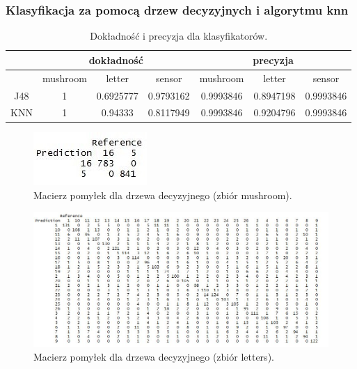 \documentclass[11pt,a4paper,twoside]{article}
\begin{document}
\newpage


\subsubsection{Klasyfikacja za pomocą drzew decyzyjnych i algorytmu knn}

\begin{table}[ht]
\centering
\caption{Dokładność i precyzja dla klasyfikatorów.}
\label{accPrec_v2}
\begin{tabular}{|*{7}{c|}}
\hline
 & \multicolumn{3}{c|}{dokładność} & \multicolumn{3}{c|}{precyzja} \\\hline
 & mushroom & letter & sensor & mushroom & letter & sensor \\\hline
J48   &   1      &   0.6925777   &    0.9793162    &    0.9993846    &   0.8947198    &   0.9993846   \\\hline
 KNN &   1      &    0.94333      &   0.8117949     &    0.9993846    &   0.9204796    &   0.9993846   \\\hline
\end{tabular}
\end{table}

\begin{figure}[ht]
\centering
\includegraphics[scale=0.9]{confMatrixJ48_mushroom.JPG}
\caption{Macierz pomyłek dla drzewa decyzyjnego (zbiór mushroom).}
\label{confMatrixJ48}
\end{figure}

\begin{figure}[H]
\centering
\includegraphics[scale=0.6]{confMatrixJ48_letters.JPG}
\caption{Macierz pomyłek dla drzewa decyzyjnego (zbiór letters).}
\label{confMatrixJ48}
\end{figure}
\end{document}
